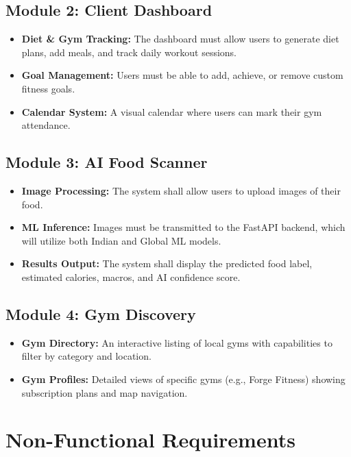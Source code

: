 \documentclass[12pt,a4paper]{article}
\begin{document}
\subsection{Module 2: Client Dashboard}
\begin{itemize}
    \item \textbf{Diet \& Gym Tracking:} The dashboard must allow users to generate diet plans, add meals, and track daily workout sessions.
    \item \textbf{Goal Management:} Users must be able to add, achieve, or remove custom fitness goals.
    \item \textbf{Calendar System:} A visual calendar where users can mark their gym attendance.
\end{itemize}

\subsection{Module 3: AI Food Scanner}
\begin{itemize}
    \item \textbf{Image Processing:} The system shall allow users to upload images of their food.
    \item \textbf{ML Inference:} Images must be transmitted to the FastAPI backend, which will utilize both Indian and Global ML models.
    \item \textbf{Results Output:} The system shall display the predicted food label, estimated calories, macros, and AI confidence score.
\end{itemize}

\subsection{Module 4: Gym Discovery}
\begin{itemize}
    \item \textbf{Gym Directory:} An interactive listing of local gyms with capabilities to filter by category and location.
    \item \textbf{Gym Profiles:} Detailed views of specific gyms (e.g., Forge Fitness) showing subscription plans and map navigation.
\end{itemize}

\section{Non-Functional Requirements}
\end{document}
